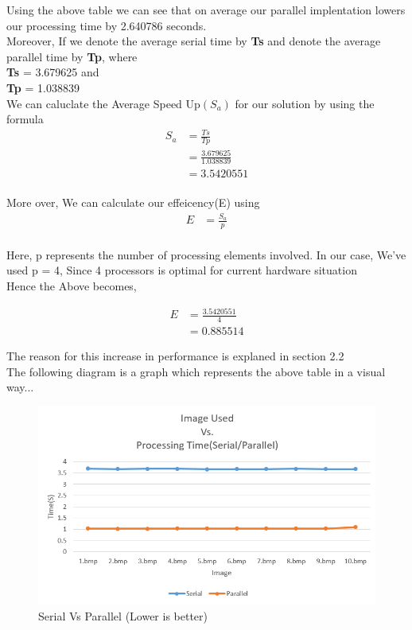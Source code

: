 \documentclass[paper=a4, fontsize=11pt]{scrartcl} %
\numberwithin{equation}{section} %
\numberwithin{figure}{section} %
\numberwithin{table}{section} %
\begin{document}
Using the above table we can see that on average our parallel implentation lowers our processing time by 2.640786 seconds.\\

Moreover, If we denote the average serial time by \textbf{Ts} and denote the average parallel time by \textbf{Tp}, where \\
\textbf{Ts} = 3.679625 and \\
\textbf{Tp} = 1.038839 \\
We can caluclate the Average Speed Up$(S_a)$ for our solution by using the formula
\begin{equation}
\begin{split}
S_a &= \frac{Ts}{Tp}  \\
	&=\frac{3.679625}{1.038839}  \\
	&=3.5420551
\end{split}
\end{equation}\\
More over, We can calculate our effeicency(E) using 
\begin{equation}
\begin{split}
E &= \frac{S_a}{p}
\end{split}
\end{equation}\\
Here, p represents the number of processing elements involved. In our case, We've used p = 4, Since 4 processors is optimal for current hardware situation\\
Hence the Above becomes,

\begin{equation}
\begin{split}
E &= \frac{3.5420551}{4}\\
	&= 0.885514
\end{split}
\end{equation}


The reason for this increase in performance is explaned in section 2.2\\

The following diagram is a graph which represents the above table in a visual way...\\


\begin{figure}[H]
	\centering
	\includegraphics[scale=0.5]{"graph2"}
	\caption{Serial Vs Parallel (Lower is better)}
        \label{graph1}
\end{figure}
\end{document}
